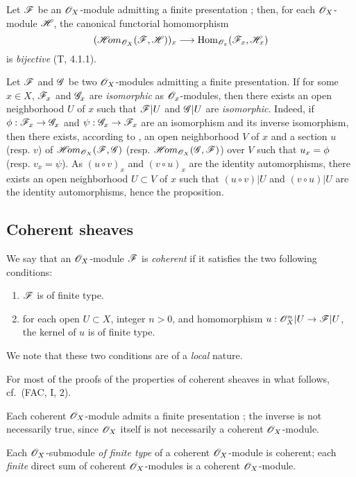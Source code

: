 \begin{env}[5.2.6]
\label{0.5.2.6}
Let $\mathscr{F}$ be an $\mathscr{O}_X$-module admitting a finite presentation ;
then, for each $\mathscr{O}_X$-module $\mathscr{H}$, the canonical functorial homomorphism
\[
  (\shHom_{\OO_X}(\sh{F},\sh{H}))_x\to\Hom_{\OO_x}(\sh{F}_x,\sh{H}_x)
\]
is \emph{bijective} (T, 4.1.1).
\end{env}

\begin{env}[5.2.7]
\label{0.5.2.7}
Let $\mathscr{F}$ and $\mathscr{G}$ be two $\mathscr{O}_X$-modules admitting a finite presentation.
If for some $x\in X$, $\mathscr{F}_x$ and $\mathscr{G}_x$ are \emph{isomorphic} as $\mathscr{O}_x$-modules, then there exists an open neighborhood $U$ of $x$ such that $\mathscr{F}|U$ and $\mathscr{G}|U$ are \emph{isomorphic}.
Indeed, if $\vphi:\sh{F}_x\to\sh{G}_x$ and $\psi:\sh{G}_x\to\sh{F}_x$ are an isomorphism and its inverse isomorphism, then there exists, according to , an open neighborhood $V$ of $x$ and a section $u$ (resp. $v$) of $\mathscr{H}\!{om}_{\mathscr{O}_X}(\mathscr{F},\mathscr{G})$ (resp. $\mathscr{H}\!{om}_{\mathscr{O}_X}(\mathscr{G},\mathscr{F})$) over $V$ such
that $u_x=\phi$ (resp. $v_x=\psi$).
As $(u\circ v)_x$ and $(v\circ u)_x$ are the identity automorphisms, there exists an open neighborhood $U\subset V$ of $x$ such that $(u\circ v)|U$ and $(v\circ u)|U$ are the identity automorphisms, hence the proposition.
\end{env}

\subsection{Coherent sheaves}
\label{subsection-coh-sheaves}

\begin{env}[5.3.1]
\label{0.5.3.1}
We say that an $\mathscr{O}_X$-module $\mathscr{F}$ is \emph{coherent} if it satisfies the two following conditions:
\begin{enumerate}[label=(\alph*)]
  \item $\mathscr{F}$ is of finite type.
  \item for each open $U\subset X$, integer $n>0$, and homomorphism $u:\OO_X^n|U\to\sh{F}|U$, the kernel of $u$ is of finite type.
\end{enumerate}
We note that these two conditions are of a \emph{local} nature.

For most of the proofs of the properties of coherent sheaves in what follows, cf.~(FAC, I, 2).
\end{env}

\begin{env}[5.3.2]
\label{0.5.3.2}
Each coherent $\mathscr{O}_X$-module admits a finite presentation ;
the inverse is not necessarily true, since $\mathscr{O}_X$ itself is not necessarily a coherent $\mathscr{O}_X$-module.

Each $\mathscr{O}_X$-submodule \emph{of finite type} of a coherent $\mathscr{O}_X$-module is coherent;
each \emph{finite} direct sum of coherent $\mathscr{O}_X$-modules is a coherent $\mathscr{O}_X$-module.
\end{env}

